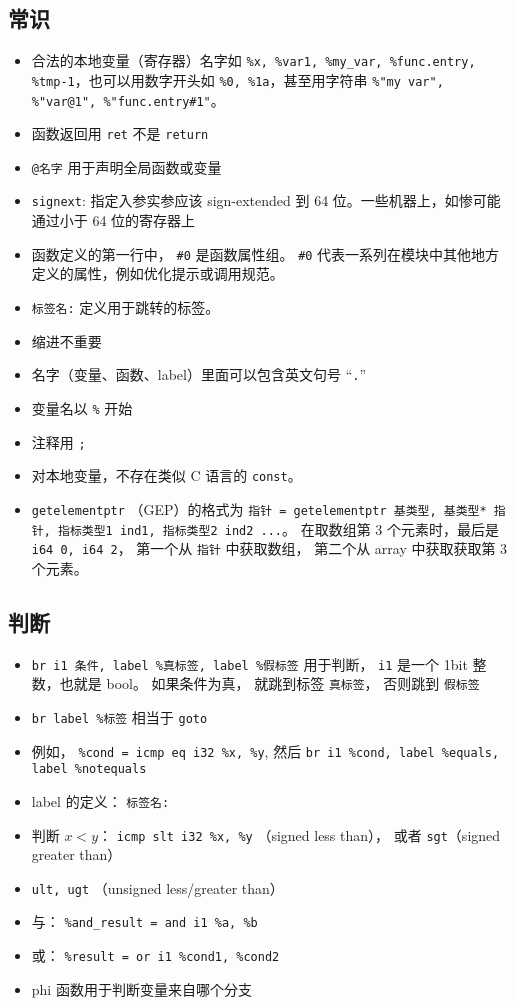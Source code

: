 \subsection{常识}
\begin{itemize}
\item 合法的本地变量（寄存器）名字如 \verb`%x, %var1, %my_var, %func.entry, %tmp-1`，也可以用数字开头如 \verb`%0, %1a`，甚至用字符串 \verb`%"my var", %"var@1", %"func.entry#1"`。
\item 函数返回用 \verb`ret` 不是 \verb`return`
\item \verb`@名字` 用于声明全局函数或变量
\item \verb`signext`: 指定入参实参应该 sign-extended 到 64 位。一些机器上，如惨可能通过小于 64 位的寄存器上
\item 函数定义的第一行中， \verb`#0` 是函数属性组。 \verb`#0` 代表一系列在模块中其他地方定义的属性，例如优化提示或调用规范。
\item \verb`标签名:` 定义用于跳转的标签。
\item 缩进不重要
\item 名字（变量、函数、label）里面可以包含英文句号 “\verb`.`”
\item 变量名以 \verb`%` 开始
\item 注释用 \verb`;`
\item 对本地变量，不存在类似 C 语言的 \verb`const`。
\item \verb`getelementptr` （GEP）的格式为 \verb`指针 = getelementptr 基类型, 基类型* 指针, 指标类型1 ind1, 指标类型2 ind2 ...`。 在取数组第 3 个元素时，最后是 \verb`i64 0, i64 2`， 第一个从 \verb`指针` 中获取数组， 第二个从 array 中获取获取第 3 个元素。
\end{itemize}

\subsection{判断}
\begin{itemize}
\item \verb`br i1 条件, label %真标签, label %假标签` 用于判断， \verb`i1` 是一个 1bit 整数，也就是 bool。 如果条件为真， 就跳到标签 \verb`真标签`， 否则跳到 \verb`假标签`
\item \verb`br label %标签` 相当于 \verb`goto`
\item 例如， \verb`%cond = icmp eq i32 %x, %y`, 然后 \verb`br i1 %cond, label %equals, label %notequals`
\item label 的定义： \verb`标签名:`
\item 判断 $x < y$： \verb`icmp slt i32 %x, %y` （signed less than）， 或者 \verb`sgt`（signed greater than）
\item \verb`ult, ugt` （unsigned less/greater than）
\item 与： \verb`%and_result = and i1 %a, %b`
\item 或： \verb`%result = or i1 %cond1, %cond2`
\item phi 函数用于判断变量来自哪个分支
\end{itemize}

